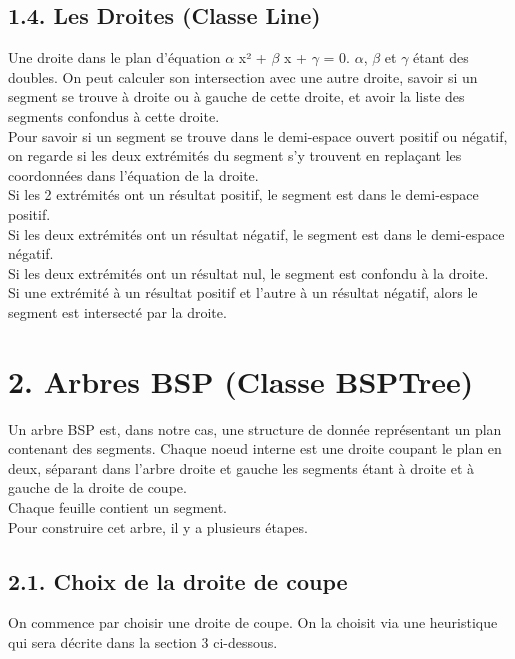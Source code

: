 \documentclass[a4paper,12pt]{report}	%
\begin{document}
    {\subsection*{1.4. Les Droites (Classe Line)}}
      Une droite dans le plan d'équation $\alpha$ x² + $\beta$ x + $\gamma$  = 0.  $\alpha$, $\beta$ et $\gamma$ étant des doubles. On peut calculer son intersection avec une autre droite, savoir si un
    segment se trouve à droite ou à gauche de cette droite, et avoir la liste des segments confondus à cette droite.\\
    Pour savoir si un segment se trouve dans le demi-espace ouvert positif ou négatif, on regarde si les deux extrémités du segment s'y trouvent
    en replaçant les coordonnées dans l'équation de la droite. \\Si les 2 extrémités ont un résultat positif, le segment est dans le demi-espace positif.\\
    Si les deux extrémités ont un résultat négatif, le segment est dans le demi-espace négatif.\\ Si les deux extrémités ont un résultat nul,
    le segment est confondu à la droite. \\ Si une extrémité à un résultat positif et l'autre à un résultat négatif, alors le segment est intersecté par la
    droite. \\
	
\newpage

	{\section*{2. Arbres BSP (Classe BSPTree)}}
	  Un arbre BSP est, dans notre cas, une structure de donnée représentant un plan contenant des segments. Chaque noeud interne est une droite
    coupant le plan en deux, séparant dans l'arbre droite et gauche les segments étant à droite et à gauche de la droite de coupe.\\
    Chaque feuille contient un segment.\\
    Pour construire cet arbre, il y a plusieurs étapes.\\
    
    {\subsection*{2.1. Choix de la droite de coupe}}
      On commence par choisir une droite de coupe. On la choisit via une heuristique qui sera décrite dans la section 3 ci-dessous.\\
    
\end{document}
